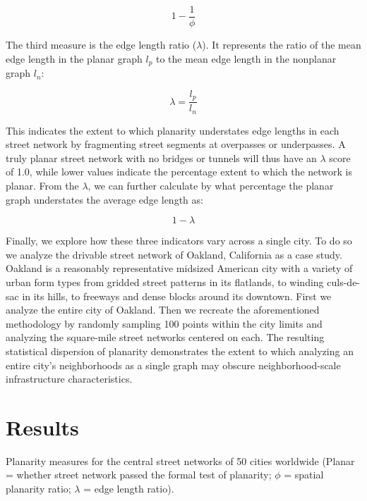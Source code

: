 \documentclass[Afour,sageh,times]{sagej}
\begin{document}
\begin{equation}
	\label{eq:spr_overstates}
	1 - \frac{1}{\phi}
\end{equation}

The third measure is the edge length ratio ($\lambda$). It represents the ratio of the mean edge length in the planar graph $l_p$ to the mean edge length in the nonplanar graph $l_n$:

\begin{equation}
	\label{eq:elr}
	\lambda = \frac{l_p}{l_n}
\end{equation}

This indicates the extent to which planarity understates edge lengths in each street network by fragmenting street segments at overpasses or underpasses. A truly planar street network with no bridges or tunnels will thus have an $\lambda$ score of 1.0, while lower values indicate the percentage extent to which the network is planar. From the $\lambda$, we can further calculate by what percentage the planar graph understates the average edge length as:

\begin{equation}
	\label{eq:elr_understates}
	1 - \lambda
\end{equation}

Finally, we explore how these three indicators vary across a single city. To do so we analyze the drivable street network of Oakland, California as a case study. Oakland is a reasonably representative midsized American city with a variety of urban form types from gridded street patterns in its flatlands, to winding culs-de-sac in its hills, to freeways and dense blocks around its downtown. First we analyze the entire city of Oakland. Then we recreate the aforementioned methodology by randomly sampling 100 points within the city limits and analyzing the square-mile street networks centered on each. The resulting statistical dispersion of planarity demonstrates the extent to which analyzing an entire city's neighborhoods as a single graph may obscure neighborhood-scale infrastructure characteristics.



\section{Results}

\begin{table}[htbp]
	\centering
	\caption{Planarity measures for the central street networks of 50 cities worldwide (Planar = whether street network passed the formal test of planarity; $\phi$ = spatial planarity ratio; $\lambda$ = edge length ratio).}
	\label{tab:world_cities}
	
\end{table}
\end{document}

